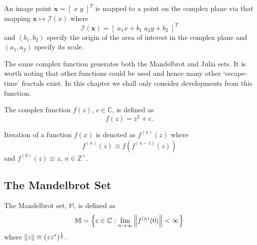 \begin{definition}
An image point $\mathbf{x} = [\; x\;y \;]^T$ is mapped to a point on the 
complex plane via that mapping $\mathbf{x} \mapsto {\mathcal I}(x)$ where
\[
{\mathcal I}({\mathbf x}) = [\; a_1 x + b_1 \; a_2 y + b_2 \;]^T
\]
and $(b_1,b_2)$ specify the origin of the area of interest in the complex
plane and $(a_1,a_2)$ specify its scale.
\end{definition}

The same complex function generates both the Mandelbrot and
Julia sets\cite{FRAC:Mandelbrot, FRAC:JuliaMandelBook}. It is worth noting
that other functions could be used and hence many other `escape-time' fractals
exist. In this chapter we shall only consider developments from this function.

\begin{definition}
The complex function $f(z)$, $c \in {\mathbb C}$,
    is defined as
\[
f(z) = z^2 + c.
\]
\end{definition}

\begin{definition}[Iteration]
Iteration of a function $f(x)$ is denoted as $f^{(n)}(z)$ where
\[
f^{(n)}(z) \equiv f(f^{(n-1)}(z))
\]
and $f^{(0)}(z) \equiv z$, $n \in {\mathbb Z}^+$.
\end{definition}

\subsection{The Mandelbrot Set}

\begin{definition}
The Mandelbrot set, $\mathbb{M}$, is defined as
\[
\mathbb{M} = 
\left\{c \in \mathbb{C} 
: \lim_{n \rightarrow \infty} \left\Vert f^{(n)}(0) \right\Vert < \infty \right\} 
\]
where $\left\Vert z \right\Vert \equiv (zz^*)^\frac{1}{2}$.
\end{definition}

